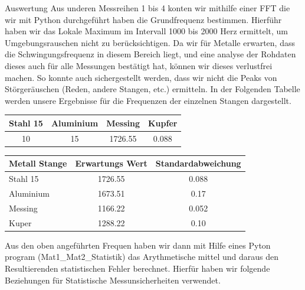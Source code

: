 \documentclass[twoside]{protokoll}
\begin{document}
\begin{aufgabe}{Auswertung}
Aus underen Messreihen 1 bis 4 konten wir mithilfe einer FFT die wir mit Python durchgeführt haben die Grundfrequenz bestimmen.
Hierführ haben wir das Lokale Maximum im Intervall 1000 bis 2000 Herz ermittelt, um Umgebungsrauschen nicht zu berücksichtigen.
Da wir für Metalle erwarten, dass die Schwingungsfrequenz in diesem Bereich liegt, und eine analyse der Rohdaten dieses auch für alle Messungen bestätigt hat, können wir dieses verlustfrei machen.
So konnte auch sichergestellt werden, dass wir nicht die Peaks von Störgeräuschen (Reden, andere Stangen, etc.) ermitteln.
In der Folgenden Tabelle werden unsere Ergebnisse für die Frequenzen der einzelnen Stangen dargestellt.

 \begin{table}[H]
        \centering
        \begin{tabularx}{0.8\textwidth}{c c c c} %
            \toprule
            \textbf{Stahl 15} & \textbf{Aluminium} & \textbf{Messing} & \textbf{Kupfer} \\
            \midrule
            10 &  15 & 1726.55 & 0.088 \\
            \bottomrule
        \end{tabularx}
        \label{tab:mytable}
    \end{table}
    

 \begin{table}[H]
        \centering
        \begin{tabularx}{0.8\textwidth}{X c c} %
            \toprule
            \textbf{Metall Stange} & \textbf{Erwartungs Wert} & \textbf{Standardabweichung} \\
            \midrule
            Stahl 15 & 1726.55 & 0.088 \\
            Aluminium & 1673.51 & 0.17 \\
            Messing & 1166.22 & 0.052 \\
            Kuper & 1288.22 & 0.10 \\
            \bottomrule
        \end{tabularx}
        \label{tab:mytable}
    \end{table}
    
Aus den oben angeführten Frequen haben wir dann mit Hilfe eines Pyton program (Mat1\_Mat2\_Statistik) das Arythmetische mittel und daraus den Resultierenden statistischen Fehler berechnet. Hierfür haben wir folgende Beziehungen für Statistische Messunsicherheiten verwendet. 


\end{aufgabe}
\end{document}
